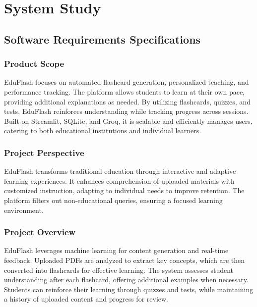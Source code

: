 \documentclass{report}
\begin{document}
\chapter{System Study}

\section{Software Requirements Specifications}

\subsection{Product Scope}
EduFlash focuses on automated flashcard generation, personalized teaching, and performance tracking. The platform allows students to learn at their own pace, providing additional explanations as needed. By utilizing flashcards, quizzes, and tests, EduFlash reinforces understanding while tracking progress across sessions. Built on Streamlit, SQLite, and Groq, it is scalable and efficiently manages users, catering to both educational institutions and individual learners.

\subsection{Project Perspective}
EduFlash transforms traditional education through interactive and adaptive learning experiences. It enhances comprehension of uploaded materials with customized instruction, adapting to individual needs to improve retention. The platform filters out non-educational queries, ensuring a focused learning environment.

\subsection{Project Overview}
EduFlash leverages machine learning for content generation and real-time feedback. Uploaded PDFs are analyzed to extract key concepts, which are then converted into flashcards for effective learning. The system assesses student understanding after each flashcard, offering additional examples when necessary. Students can reinforce their learning through quizzes and tests, while maintaining a history of uploaded content and progress for review.
\end{document}
